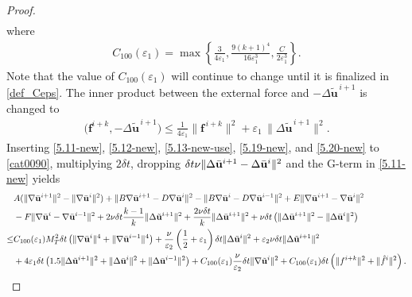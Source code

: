 \documentclass{article}
\theoremstyle{definition}                   %
\begin{document}
\begin{proof}
\begin{align}
\label{5.19-new}
\end{align}
where   
\begin{align}
C_{100}(\varepsilon_1)=\max\left\{\frac{3}{4\varepsilon_1}, \frac{9 (k+1)^4}{16 \varepsilon_1^3}, \frac{C}{2\varepsilon_1^3} \right\}.
\label{cat0026}
\end{align}
Note that the value of $C_{100}(\varepsilon_1)$ will continue to change until it is finalized in \eqref{def_Ceps}.
%
The inner product between the external force and $- \Delta \widetilde{\mathbf{u}}^{\,i+1}$ is changed to 
\begin{align}
\bigl( \mathbf{f}^{i+k}, - \Delta \widetilde{\mathbf{u}}^{\,i+1} \bigr)
\le 
\frac{1}{4\varepsilon_1} \|\mathbf{f}^{\,i+k}\|^{2}
+ 
\varepsilon_1\,\|\Delta \widetilde{\mathbf{u}}^{\,i+1}\|^{2}.
\label{5.20-new}
\end{align}
%
Inserting \eqref{5.11-new}, \eqref{5.12-new}, \eqref{5.13-new-use}, \eqref{5.19-new}, and \eqref{5.20-new} to \eqref{cat0090},  multiplying $2\delta t$, dropping $\delta t\nu \|\Delta \bar{\bf u}^{i+1} - \Delta \bar{\bf u}^i \|^2$ and the G-term in \eqref{5.11-new} yields
\begin{align}
&A(\|\nabla\bar{\mathbf{u}}^{i+1}\|^2 - \|\nabla\bar{\mathbf{u}}^i\|^2) + \|B\nabla\bar{\mathbf{u}}^{i+1} - D\nabla\bar{\mathbf{u}}^i\|^2 
- \|B\nabla\bar{\mathbf{u}}^i - D\nabla\bar{\mathbf{u}}^{i-1}\|^2+ 
E\|\nabla\bar{\mathbf{u}}^{i+1} - \nabla\bar{\mathbf{u}}^i\|^2 \notag\\
&- F\|\nabla\bar{\mathbf{u}}^i - \nabla\bar{\mathbf{u}}^{i-1}\|^2 
+ 2\nu\delta t \frac{k-1}{k} \|\Delta\tilde{\mathbf{u}}^{i+1}\|^2 
+ \frac{2\nu\delta t}{k} 
\|\Delta\bar{\mathbf{u}}^{i+1}\|^2 
+ \nu\delta t \left(\|\Delta\bar{\mathbf{u}}^{i+1}\|^2 - \|\Delta\bar{\mathbf{u}}^i\|^2\right) \notag \\
\leq & C_{100}(\varepsilon_1)M_T^2 \delta t 
\left(\|\nabla\bar{\mathbf{u}}^i\|^4 + \|\nabla\bar{\mathbf{u}}^{i-1}\|^4\right) + \frac{\nu}{\varepsilon_2}\left(\frac{1}{2} + \varepsilon_1\right) \delta t \|\Delta\tilde{\mathbf{u}}^i\|^2 + \varepsilon_2\nu\delta t \|\Delta\tilde{\mathbf{u}}^{i+1}\|^2 \notag \\
&+ 4\varepsilon_1\delta t 
\left(1.5 \|\Delta\tilde{\mathbf{u}}^{i+1}\|^2 
 + \|\Delta\bar{\mathbf{u}}^i\|^2 + \|\Delta\bar{\mathbf{u}}^{i-1}\|^2\right)+ C_{100}(\varepsilon_1) \frac{\nu}{\varepsilon_2} \delta t \|\nabla\tilde{\mathbf{u}}^i\|^2 + C_{100}(\varepsilon_1)\delta t \left(\|f^{i+k}\|^2 + \|\hat{f}^i\|^2\right).
\label{5.21-new}
\end{align}

\end{proof}
\end{document}
